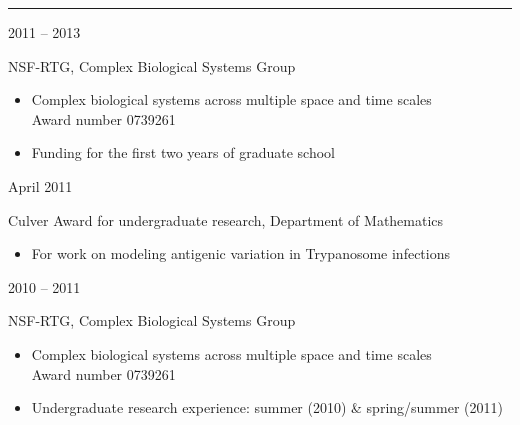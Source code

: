 \documentclass[a4paper,10pt]{article}
\newlength{\cvcolumngapwidth}
\newlength{\cvleftcolumnwidth}
\newlength{\cvrightcolumnwidth}
\newcommand{\cvsectionstyle}[1]{{\normalsize\cvsectionfont\textcolor{cvsectioncolor}{#1}}}
\newcommand{\cvtitlestyle}[1]{{\large\cvtitlefont\textcolor{cvtitlecolor}{#1}}}
\newcommand{\cvheadingstyle}[1]{{\normalsize\cvheadingfont\textcolor{cvheadingcolor}{#1}}}
\newlength{\cvafteritemskipamount}
\newlength{\cvaftersectionskipamount}
\newlength{\cvbetweensectionandheadingextraskipamount}
\newlength{\cvaftertitleskipamount}
\newlength{\cvparskip}
\newcommand{\cvsection}[1]{
            \begin{minipage}[t]{\cvleftcolumnwidth}
                \raggedleft\cvsectionstyle{#1}
            \end{minipage}%
            \hspace{\cvcolumngapwidth}%
            \begin{minipage}[t]{\cvrightcolumnwidth}
                \textcolor{cvrulecolor}{\rule{\cvrightcolumnwidth}{0.3mm}}
            \end{minipage}
        
            \vspace{\cvaftersectionskipamount}
        }
\newcommand{\cvitem}[2]{
            \begin{minipage}[t]{\cvleftcolumnwidth}
                \raggedleft #1
            \end{minipage}%
            \hspace{\cvcolumngapwidth}%
            \begin{minipage}[t]{\cvrightcolumnwidth}
                \setlength{\parskip}{\cvparskip} #2
            \end{minipage}
        
            \vspace{\cvafteritemskipamount}
        }
\newcommand{\cvtitle}[1]{
            \cvtitlestyle{#1}
        
            \vspace{\cvaftertitleskipamount}
            \vspace{-\cvparskip}
        }
\begin{document}
        
        
        
        
        \cvsection{AWARDS \& FELLOWSHIPS}
        \vspace{\cvbetweensectionandheadingextraskipamount}
        
        \cvitem{
            \cvheadingstyle{2011 -- 2013}
        }{
             \cvtitle{NSF-RTG, Complex Biological Systems Group}
            \begin{itemize}[leftmargin=*]
        
                \item Complex biological systems across multiple space and time scales \\ Award number 0739261
                \item Funding for the first two years of graduate school
            \end{itemize}
            
        }
        
        
        \cvitem{
            \cvheadingstyle{April 2011}
        }{
            \cvtitle{Culver Award for undergraduate research, Department of Mathematics}
            \begin{itemize}[leftmargin=*]
        	\item For work on modeling antigenic variation in Trypanosome infections
            \end{itemize}
            
        }
        
        
        \cvitem{
            \cvheadingstyle{2010 -- 2011}
        }{
             \cvtitle{NSF-RTG, Complex Biological Systems Group}
            \begin{itemize}[leftmargin=*]
        
                \item Complex biological systems across multiple space and time scales \\ Award number 0739261
                \item Undergraduate research experience: summer (2010) \& spring/summer (2011)
            \end{itemize}
            
        }
        
\end{document}
